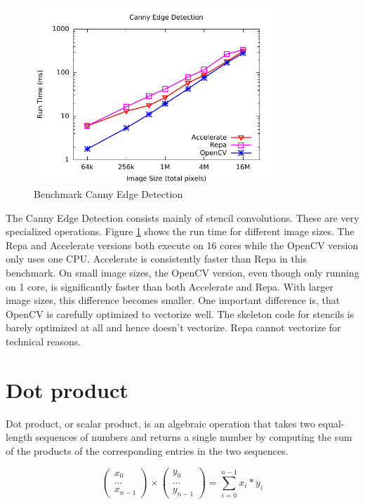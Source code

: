 \documentclass[a4paper,bibliography=totocnumbered,parskip,headsepline]{scrbook}
\begin{document}
\begin{figure}
    \centering
    \includegraphics[width=0.8\textwidth]{images/benchmarks/canny/canny}
    \caption{Benchmark Canny Edge Detection}
    \label{fig:canny}
\end{figure}

The Canny Edge Detection consists mainly of stencil convolutions.
These are very specialized operations.
Figure \ref{fig:canny} shows the run time for different image sizes.
The Repa and Accelerate versions both execute on 16 cores while the OpenCV version only uses one CPU.
Accelerate is consistently faster than Repa in this benchmark.
On small image sizes, the OpenCV version, even though only running on 1 core, is significantly faster than both Accelerate and Repa.
With larger image sizes, this difference becomes smaller.
One important difference is, that OpenCV is carefully optimized to vectorize well.
The skeleton code for stencils is barely optimized at all and hence doesn't vectorize.
Repa cannot vectorize for technical reasons.\cite{lippmeier2012efficient}

\section{Dot product}
Dot product, or scalar product, is an algebraic operation that takes two equal-length sequences of numbers and returns a single number by computing the sum of the products of the corresponding entries in the two sequences.

\[
\begin{pmatrix}
x_0 \\ ... \\ x_{n-1}
\end{pmatrix}
\times
\begin{pmatrix}
y_0 \\ ... \\ y_{n-1}
\end{pmatrix}
= \displaystyle\sum_{i=0}^{n-1} x_i*y_i
\]
\end{document}
